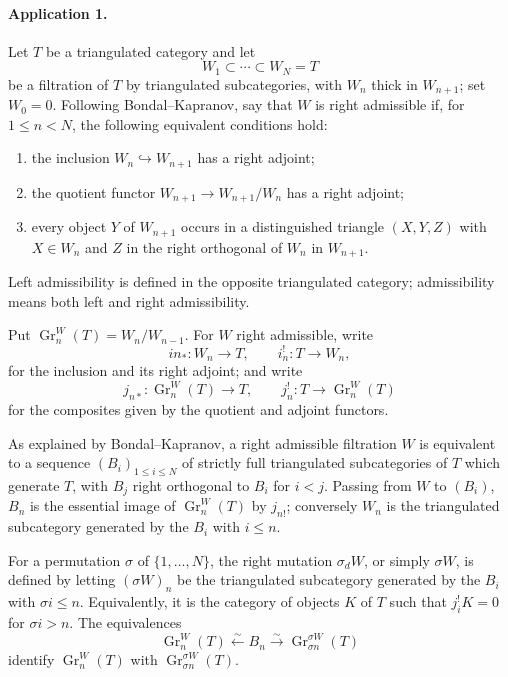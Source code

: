 \documentclass[11pt]{article}
\begin{document}
\paragraph{Application 1.} Let $T$ be a triangulated category and let
\[
W_1\subset\cdots\subset W_N=T
\]
be a filtration of $T$ by triangulated subcategories, with $W_n$ thick in $W_{n+1}$; set $W_0=0$. Following Bondal--Kapranov, say that $W$ is right admissible if, for $1\le n<N$, the following equivalent conditions hold:
\begin{enumerate}[label=(\roman*)]
\item the inclusion $W_n\hookrightarrow W_{n+1}$ has a right adjoint;
\item the quotient functor $W_{n+1}\to W_{n+1}/W_n$ has a right adjoint;
\item every object $Y$ of $W_{n+1}$ occurs in a distinguished triangle $(X,Y,Z)$ with $X\in W_n$ and $Z$ in the right orthogonal of $W_n$ in $W_{n+1}$.
\end{enumerate}
Left admissibility is defined in the opposite triangulated category; admissibility means both left and right admissibility.

Put $\operatorname{Gr}_n^W(T)=W_n/W_{n-1}$. For $W$ right admissible, write
\[
in_*:W_n\to T,
\qquad i_n^!:T\to W_n,
\]
for the inclusion and its right adjoint; and write
\[
j_{n*}:\operatorname{Gr}_n^W(T)\to T,
\qquad j_n^!:T\to\operatorname{Gr}_n^W(T)
\]
for the composites given by the quotient and adjoint functors.

As explained by Bondal--Kapranov, a right admissible filtration $W$ is equivalent to a sequence $(B_i)_{1\le i\le N}$ of strictly full triangulated subcategories of $T$ which generate $T$, with $B_j$ right orthogonal to $B_i$ for $i<j$. Passing from $W$ to $(B_i)$, $B_n$ is the essential image of $\operatorname{Gr}_n^W(T)$ by $j_{n!}$; conversely $W_n$ is the triangulated subcategory generated by the $B_i$ with $i\le n$.

For a permutation $\sigma$ of $\{1,\ldots,N\}$, the right mutation $\sigma_d W$, or simply $\sigma W$, is defined by letting $(\sigma W)_n$ be the triangulated subcategory generated by the $B_i$ with $\sigma i\le n$. Equivalently, it is the category of objects $K$ of $T$ such that $j_i^!K=0$ for $\sigma i>n$. The equivalences
\begin{equation}
\operatorname{Gr}_n^W(T) \xleftarrow{\sim} B_n \xrightarrow{\sim} \operatorname{Gr}_{\sigma n}^{\sigma W}(T)
\tag{0.2}
\end{equation}
identify $\operatorname{Gr}_n^W(T)$ with $\operatorname{Gr}_{\sigma n}^{\sigma W}(T)$.
\end{document}
